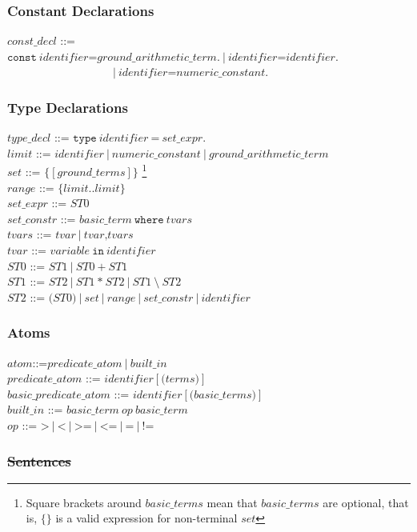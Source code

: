 \documentclass[a4paper,10pt]{article}
\providecommand{\DIFdeltex}[1]{{\protect\color{red}\sout{#1}}}                      %
\providecommand{\DIFdelbegin}{} %
\providecommand{\DIFdelend}{} %
\providecommand{\DIFdel}[1]{\texorpdfstring{\DIFdeltex{#1}}{}} %
\begin{document}
\subsubsection{Constant Declarations}
$const\_decl$ ::= $\texttt{const} ~identifier \texttt{=} ground\_arithmetic\_term.~|~identifier \texttt{=} identifier.~$\\
~~~~~~~~~~$~~~~~~~~~~~~~~~~~~~~|~identifier \texttt{=} numeric\_constant.$
\subsubsection{Type Declarations}

$type\_decl$ ::= $\texttt{type}~identifier~ \texttt{=} ~set\_expr.$\\
$limit$ ::= $identifier~|~numeric\_constant~|~ground\_arithmetic\_term$\\
$set$ ::= $\texttt{\{} [ground\_terms] \texttt{\}}$ \footnote{Square brackets around $basic\_terms$ mean that $basic\_terms$ are optional, that is, $\{ \}$  is a valid expression for non-terminal $set$}\\
$range$ ::= $\texttt{\{}limit..limit\texttt{\}}$\\
$set\_expr$ ::= $ST0$ \\  
$set\_constr$ ::= $basic\_term~\texttt{where}~tvars $\\
$tvars$ ::= $tvar~|~tvar\texttt{,} tvars$\\
$tvar$ ::= $variable~\texttt{in}~identifier$  \\
$ST0$ ::= $ST1~|~ST0~\texttt{+}~ST1$\\
$ST1$ ::= $ST2~|~ST1~\texttt{*}~ST2~|~ST1~\texttt{\textbackslash}~ST2$ \\
$ST2$ ::= $\texttt{(}ST0\texttt{)}~|~set~|~range~|~set\_constr~|~identifier$  \\


\subsubsection{Atoms}
$atom$::=$predicate\_atom~|~built\_in $\\
$predicate\_atom$ ::= $identifier [\texttt{(} terms \texttt{)}]$\\
$basic\_predicate\_atom$ ::= $identifier [\texttt{(} basic\_terms \texttt{)}]$\\
$built\_in$ ::= $ basic\_term~op~basic\_term$\\
$op$ ::= $\texttt{>}~|~\texttt{<}~|~\texttt{>=}~|~\texttt{<=}~|~\texttt{=}~|~\texttt{!=}$ \\
\DIFdelbegin \subsubsection{\DIFdel{Sentences}}
\addtocounter{subsubsection}{-1}%
\DIFdelend 
\end{document}

